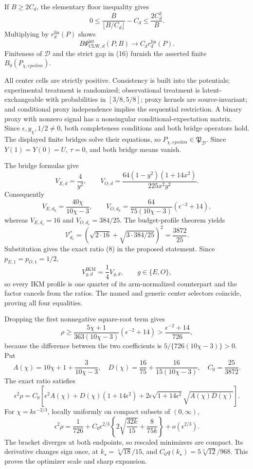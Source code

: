 If \(B\ge2C_d\), the elementary floor inequality gives
\[
 0\le \frac{B}{\lfloor B/C_d\rfloor}-C_d
 \le\frac{2C_d^2}{B}.                                     \tag{17}
\]
Multiplying by \(r_d^{\mathrm{lin}}(P)\) shows
\[
 B\Psi_{\mathrm{CLW},d}^{\mathrm{int}}(P;B)
 \longrightarrow C_dr_d^{\mathrm{lin}}(P).                \tag{18}
\]
Finiteness of \(\mathcal D\) and the strict gap in (16) furnish the asserted finite \(B_0(P_{\chi,epsilon})\).

All center cells are strictly positive. Consistency is built into the potentials; experimental treatment is randomized; observational treatment is latent-exchangeable with probabilities in \([3/8,5/8]\); proxy kernels are source-invariant; and conditional proxy independence implies the sequential restriction. A binary proxy with nonzero signal has a nonsingular conditional-expectation matrix. Since \(\epsilon,y_\chi,1/2\ne0\), both completeness conditions and both bridge operators hold. The displayed finite bridges solve their equations, so \(P_{\chi,epsilon}\in\mathfrak P_{\mathcal D}\). Since \(Y(1)=Y(0)=U\), \(\tau=0\), and both bridge means vanish.

The bridge formulas give
\[
 V_{E,d}=\frac4{y^2},
 \qquad
 V_{O,d}=\frac{64(1-y^2)(1+14x^2)}{225x^2y^2}.             \tag{19}
\]
Consequently
\[
 V_{E,d_{\mathrm p}}=\frac{40\chi}{10\chi-3},
 \qquad
 V_{O,d_{\mathrm p}}
 =\frac{64}{75(10\chi-3)}(\epsilon^{-2}+14),              \tag{20}
\]
whereas \(V_{E,d_{\mathrm e}}=16\) and \(V_{O,d_{\mathrm e}}=384/25\). The budget-profile theorem yields
\[
 \mathcal V_{d_{\mathrm e}}^*
 =\left(\sqrt{2\cdot16}+\sqrt{3\cdot384/25}\right)^2
 =\frac{3872}{25}.                                         \tag{21}
\]
Substitution gives the exact ratio (8) in the proposed statement. Since \(p_{E,1}=p_{O,1}=1/2\),
\[
 V_{g,d}^{\mathrm{IKM}}=\frac14V_{g,d},
 \qquad g\in\{E,O\},                                     \tag{22}
\]
so every IKM profile is one quarter of its arm-normalized counterpart and the factor cancels from the ratios. The named and generic center selectors coincide, proving all four equalities.

Dropping the first nonnegative square-root term gives
\[
 \rho\ge\frac{5\chi+1}{363(10\chi-3)}(\epsilon^{-2}+14)
 >\frac{\epsilon^{-2}+14}{726},                            \tag{23}
\]
because the difference between the two coefficients is \(5/\{726(10\chi-3)\}>0\). Put
\[
 A(\chi)=10\chi+1+\frac3{10\chi-3},
 \quad D(\chi)=\frac{16}{75}+\frac{16}{15(10\chi-3)},
 \quad C_0=\frac{25}{3872}.
\]
The exact ratio satisfies
\[
 \epsilon^2\rho
 =C_0\left[\epsilon^2A(\chi)+D(\chi)(1+14\epsilon^2)
 +2\epsilon\sqrt{1+14\epsilon^2}\sqrt{A(\chi)D(\chi)}\right]. \tag{24}
\]
For \(\chi=k\epsilon^{-2/3}\), locally uniformly on compact subsets of \((0,\infty)\),
\[
 \epsilon^2\rho
 =\frac1{726}+C_0\epsilon^{2/3}
 \left\{2\sqrt{\frac{32k}{15}}+\frac8{75k}\right\}
 +o(\epsilon^{2/3}).                                       \tag{25}
\]
The bracket diverges at both endpoints, so rescaled minimizers are compact. Its derivative changes sign once, at \(k_\star=\sqrt[3]{18}/15\), and \(C_0q(k_\star)=5\sqrt[3]{12}/968\). This proves the optimizer scale and sharp expansion.